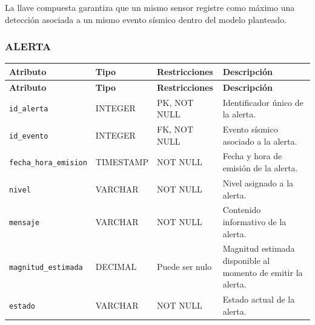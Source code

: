 \documentclass[12pt,a4paper]{article}
\begin{document}
La llave compuesta garantiza que un mismo sensor registre como máximo una detección asociada a un mismo evento sísmico dentro del modelo planteado.


\subsubsection*{ALERTA}

{
\small
\setlength{\tabcolsep}{3pt}
\renewcommand{\arraystretch}{1.15}

\begin{longtable}{
    >{\raggedright\arraybackslash}p{4.25cm}
    >{\raggedright\arraybackslash}p{2.65cm}
    >{\raggedright\arraybackslash}p{3.85cm}
    >{\raggedright\arraybackslash}p{3.85cm}
}
\toprule
\textbf{Atributo} &
\textbf{Tipo} &
\textbf{Restricciones} &
\textbf{Descripción} \\
\midrule
\endfirsthead

\toprule
\textbf{Atributo} &
\textbf{Tipo} &
\textbf{Restricciones} &
\textbf{Descripción} \\
\midrule
\endhead

\texttt{id\_\allowbreak{}alerta} &
INTEGER &
PK, NOT NULL &
Identificador único de la alerta. \\

\texttt{id\_\allowbreak{}evento} &
INTEGER &
FK, NOT NULL &
Evento sísmico asociado a la alerta. \\

\texttt{fecha\_\allowbreak{}hora\_\allowbreak{}emision} &
TIMESTAMP &
NOT NULL &
Fecha y hora de emisión de la alerta. \\

\texttt{nivel} &
VARCHAR &
NOT NULL &
Nivel asignado a la alerta. \\

\texttt{mensaje} &
VARCHAR &
NOT NULL &
Contenido informativo de la alerta. \\

\texttt{magnitud\_\allowbreak{}estimada} &
DECIMAL &
Puede ser nulo &
Magnitud estimada disponible al momento de emitir la alerta. \\

\texttt{estado} &
VARCHAR &
NOT NULL &
Estado actual de la alerta. \\

\bottomrule
\end{longtable}
}
\end{document}
